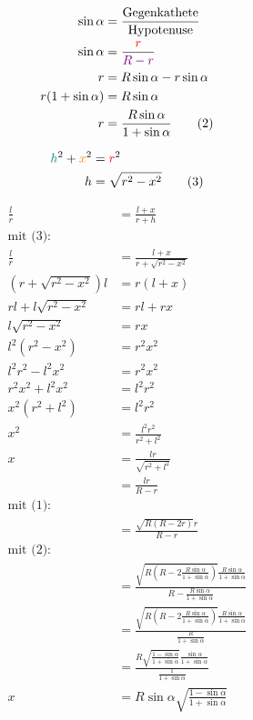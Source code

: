 \documentclass[12pt,a4paper,oneside]{article}
\begin{document}
\begin{align*}
	\sin\alpha &= \frac{\text{Gegenkathete}}{\text{Hypotenuse}} \\
	\sin\alpha &= \frac{ \textcolor{red}{r} }{ \textcolor{violet}{R-r} } \\
	r &= R\sin\alpha - r\sin\alpha \\
	r(1+\sin\alpha) &= R\sin\alpha \\
	r &= \frac{R\sin\alpha}{1+\sin\alpha} \tag{2}
\end{align*}

\begin{align*}
	\textcolor{teal}{h}^2 + \textcolor{orange}{x}^2 &= \textcolor{red}{r}^2 \\
	h &= \sqrt{r^2-x^2} \tag{3}
\end{align*}

\begin{samepage}
	\begin{align*}
		\frac{l}{r} &= \frac{l+x}{r+h} \\
		\text{mit (3):} \\
		\frac{l}{r} &= \frac{l+x}{r+\sqrt{r^2-x^2}} \\
		(r+\sqrt{r^2-x^2})l &= r(l+x) \\
		rl + l\sqrt{r^2-x^2} &= rl+rx \\
		l\sqrt{r^2-x^2} &= rx \\
		l^2(r^2-x^2) &= r^2 x^2 \\
		l^2 r^2 - l^2 x^2 &= r^2 x^2 \\
		r^2 x^2 + l^2 x^2 &= l^2 r^2 \\
		x^2 (r^2+l^2) &= l^2 r^2 \\
		x^2 &= \frac{l^2 r^2}{r^2 + l^2} \\
		x &= \frac{lr}{\sqrt{r^2+l^2}} \\
		&= \frac{lr}{R-r} \\
		\text{mit (1):} \\
		&= \frac{\sqrt{R(R-2r)}r}{R-r} \\
		\text{mit (2):} \\
		&= \frac{\sqrt{R(R-2\frac{R\sin\alpha}{1+\sin\alpha})}\frac{R\sin\alpha}{1+\sin\alpha}}{R-\frac{R\sin\alpha}{1+\sin\alpha}} \\
		&= \frac{\sqrt{R(R-2\frac{R\sin\alpha}{1+\sin\alpha})}\frac{R\sin\alpha}{1+\sin\alpha}}{\frac{R}{1+\sin\alpha}} \\
		&= \frac{R\sqrt{\frac{1-\sin\alpha}{1+\sin\alpha}}\frac{\sin\alpha}{1+\sin\alpha}}{\frac{1}{1+\sin\alpha}} \\
		x &= R\sin\alpha\sqrt{\frac{1-\sin\alpha}{1+\sin\alpha}} \tag{4}
	\end{align*}
\end{samepage} \goodbreak
\end{document}
